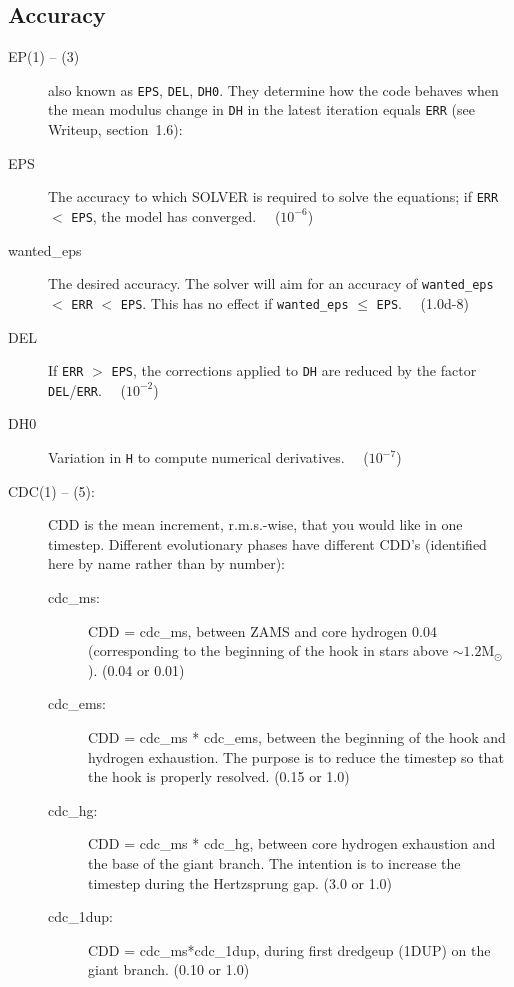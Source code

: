 \subsection{Accuracy}
\label{sec:initdat:accuracy}
\begin{description}
\item[EP(1) -- (3)] also known as \texttt{EPS}, \texttt{DEL}, \texttt{DH0}.  They determine how the code behaves when the mean modulus change in \texttt{DH} in the latest iteration equals \texttt{ERR} (see Writeup, section~1.6):
\item[EPS]\hypertarget{eps}{} The accuracy to which SOLVER is required to solve the equations; if \texttt{ERR} $<$ \texttt{EPS}, the model has converged.   \ \  ($10^{-6}$)
\item[wanted\_eps]\hypertarget{wanted_eps}{} The desired accuracy. The solver will aim for an accuracy of \texttt{wanted\_eps} $<$ \texttt{ERR} $<$ \texttt{EPS}.  This has no effect if \texttt{wanted\_eps} $\leq$ \texttt{EPS}. \ \  (1.0d-8)
\item[DEL]\hypertarget{del}{} If \texttt{ERR} $>$ \texttt{EPS}, the corrections applied to \texttt{DH} are reduced by the factor \texttt{DEL}/\texttt{ERR}.   \ \  ($10^{-2}$)
\item[DH0]\hypertarget{dh0}{} Variation in \texttt{H} to compute numerical derivatives. \ \  ($10^{-7}$)
\item[CDC(1) -- (5):]\hypertarget{cdc}{} CDD is the mean increment, r.m.s.-wise, that you would like in one timestep.  Different evolutionary phases have different CDD's (identified here by name rather than by number):
  \begin{description}
  \item[cdc\_ms:]\hypertarget{cdc_ms}{}  CDD = cdc\_ms, between ZAMS and core hydrogen 0.04 (corresponding to the beginning of the hook in stars above $\sim 1.2\mathrm{M}_\odot$). (0.04 or 0.01)
  \item[cdc\_ems:]\hypertarget{cdc_ems}{}  CDD = cdc\_ms * cdc\_ems, between the beginning of the hook and hydrogen exhaustion. The purpose is to reduce the timestep so that the hook is properly resolved. (0.15 or 1.0)
  \item[cdc\_hg:]\hypertarget{cdc_hg}{}  CDD = cdc\_ms * cdc\_hg, between core hydrogen exhaustion and the base of the giant branch. The intention is to increase the timestep during the Hertzsprung gap. (3.0 or 1.0)
  \item[cdc\_1dup:]\hypertarget{cdc_1dup}{}  CDD = cdc\_ms*cdc\_1dup, during first dredgeup (1DUP) on the giant branch.  (0.10 or 1.0)

\end{description}
\end{description}
